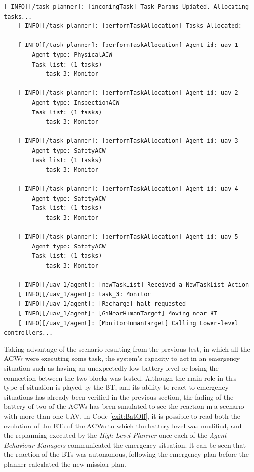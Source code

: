 \begin{lstlisting}[caption={Feedback messages printed after changing the parameters of a task}, breaklines=true, label=exit:paramChange]
    [ INFO][/task_planner]: [incomingTask] Task Params Updated. Allocating tasks...
    [ INFO][/task_planner]: [performTaskAllocation] Tasks Allocated:
    
    [ INFO][/task_planner]: [performTaskAllocation] Agent id: uav_1
        Agent type: PhysicalACW
        Task list: (1 tasks)
            task_3: Monitor
    
    [ INFO][/task_planner]: [performTaskAllocation] Agent id: uav_2
        Agent type: InspectionACW
        Task list: (1 tasks)
            task_3: Monitor
    
    [ INFO][/task_planner]: [performTaskAllocation] Agent id: uav_3
        Agent type: SafetyACW
        Task list: (1 tasks)
            task_3: Monitor
    
    [ INFO][/task_planner]: [performTaskAllocation] Agent id: uav_4
        Agent type: SafetyACW
        Task list: (1 tasks)
            task_3: Monitor
    
    [ INFO][/task_planner]: [performTaskAllocation] Agent id: uav_5
        Agent type: SafetyACW
        Task list: (1 tasks)
            task_3: Monitor
    
    [ INFO][/uav_1/agent]: [newTaskList] Received a NewTaskList Action
    [ INFO][/uav_1/agent]: task_3: Monitor
    [ INFO][/uav_1/agent]: [Recharge] halt requested
    [ INFO][/uav_1/agent]: [GoNearHumanTarget] Moving near HT...
    [ INFO][/uav_1/agent]: [MonitorHumanTarget] Calling Lower-level controllers...
\end{lstlisting}

Taking advantage of the scenario resulting from the previous test, in which all the \glspl{ACW} were executing some task, the system's capacity to act in an emergency situation such as having an unexpectedly low battery level or losing the connection between the two blocks was tested. Although the main role in this type of situation is played by the \gls{BT}, and its ability to react to emergency situations has already been verified in the previous section, the fading of the battery of two of the \glspl{ACW} has been simulated to see the reaction in a scenario with more than one \gls{UAV}. In Code \ref{exit:BatOff}, it is possible to read both the evolution of the \glspl{BT} of the \glspl{ACW} to which the battery level was modified, and the replanning executed by the \emph{High-Level Planner} once each of the \emph{Agent Behaviour Managers} communicated the emergency situation. It can be seen that the reaction of the \glspl{BT} was autonomous, following the emergency plan before the planner calculated the new mission plan.

